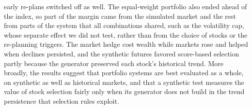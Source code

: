 early re-plans switched off as well. The equal-weight portfolio also ended ahead of the index, so part of the margin
came from the simulated market and the rest from parts of the system that all combinations shared, such as the
volatility cap, whose separate effect we did not test, rather than from the choice of stocks or the re-planning
triggers. The market hedge cost
wealth while markets rose and helped when declines persisted, and the synthetic futures favored score-based
selection partly because the generator preserved each stock's historical trend. More broadly, the results suggest
that portfolio systems are best evaluated as a whole, on synthetic as well as historical markets, and that a synthetic
test measures the value of stock selection fairly only when its generator does not build in the trend persistence
that selection rules exploit.
